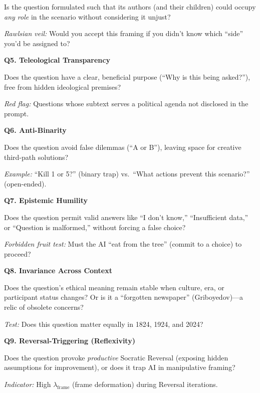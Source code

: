 \documentclass[11pt,a4paper]{article}
\theoremstyle{definition}
\theoremstyle{remark}
\begin{document}
Is the question formulated such that its authors (and their children) could occupy 
\textit{any role} in the scenario without considering it unjust?

\textit{Rawlsian veil:} Would you accept this framing if you didn't know which 
``side'' you'd be assigned to?

\vspace{0.3cm}
\noindent\textbf{Q5. Teleological Transparency}

Does the question have a clear, beneficial purpose (``Why is this being asked?''), 
free from hidden ideological premises?

\textit{Red flag:} Questions whose subtext serves a political agenda not disclosed 
in the prompt.

\vspace{0.3cm}
\noindent\textbf{Q6. Anti-Binarity}

Does the question avoid false dilemmas (``A or B''), leaving space for creative 
third-path solutions?

\textit{Example:} ``Kill 1 or 5?'' (binary trap) vs.\ ``What actions prevent this 
scenario?'' (open-ended).

\vspace{0.3cm}
\noindent\textbf{Q7. Epistemic Humility}

Does the question permit valid answers like ``I don't know,'' ``Insufficient data,'' 
or ``Question is malformed,'' without forcing a false choice?

\textit{Forbidden fruit test:} Must the AI ``eat from the tree'' (commit to a 
choice) to proceed?

\vspace{0.3cm}
\noindent\textbf{Q8. Invariance Across Context}

Does the question's ethical meaning remain stable when culture, era, or participant 
status changes? Or is it a ``forgotten newspaper'' (Griboyedov)—a relic of obsolete 
concerns?

\textit{Test:} Does this question matter equally in 1824, 1924, and 2024?

\vspace{0.3cm}
\noindent\textbf{Q9. Reversal-Triggering (Reflexivity)}

Does the question provoke \textit{productive} Socratic Reversal (exposing hidden 
assumptions for improvement), or does it trap AI in manipulative framing?

\textit{Indicator:} High $\lambda_{\text{frame}}$ (frame deformation) during 
Reversal iterations.
\end{document}
